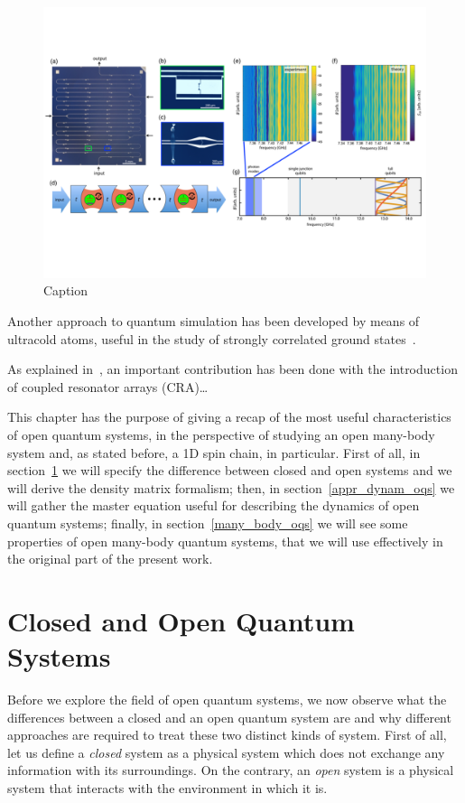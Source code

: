\begin{figure}
    \centering
    \includegraphics[scale=0.5]{Figures/PhysRevX_image_7011016.pdf}
    \caption{Caption}
    \label{fig:my_label}
\end{figure}

Another approach to quantum simulation has been developed by means of ultracold atoms, useful in the study of strongly correlated ground states~\cite{nphys1073}. 

As explained in~\cite{Noh_2016}, an important contribution has been done with the introduction of coupled resonator arrays (CRA)\dots

This chapter has the purpose of giving a recap of the most useful characteristics of open quantum systems, in the perspective of studying an open many-body system and, as stated before, a 1D spin chain, in particular. First of all, in section~\ref{cl_open_qs} we will specify the difference between closed and open systems and we will derive the density matrix formalism; then, in section~\ref{appr_dynam_oqs} we will gather the master equation useful for describing the dynamics of open quantum systems; finally, in section~\ref{many_body_oqs} we will see some properties of open many-body quantum systems, that we will use effectively in the original part of the present work.

\section{Closed and Open Quantum Systems}
\label{cl_open_qs}
Before we explore the field of open quantum systems, we now observe what the differences between a closed and an open quantum system are and why different approaches are required to treat these two distinct kinds of system. First of all, let us define a \emph{closed} system as a physical system which does not exchange any information with its surroundings. On the contrary, an \emph{open} system is a physical system that interacts with the environment in which it is. 

